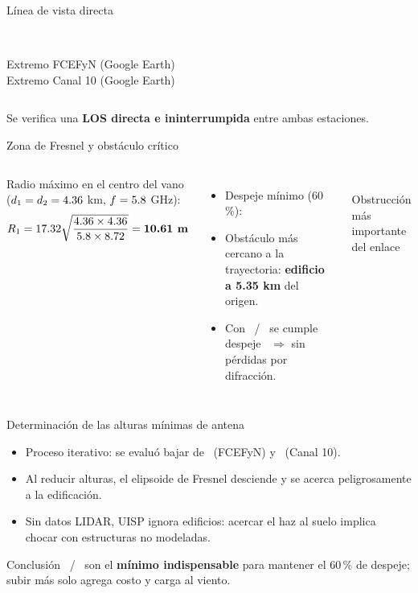 \begin{frame}{Línea de vista directa}
  \begin{columns}[c]
    \centering
    \\
    {\scriptsize Extremo FCEFyN (Google Earth)}
    \centering
    \\
    {\scriptsize Extremo Canal 10 (Google Earth)}
  \end{columns}
  \vspace{6pt}
  \centering Se verifica una \textbf{LOS directa e ininterrumpida} entre ambas estaciones.
\end{frame}

\begin{frame}{Zona de Fresnel y obstáculo crítico}
  \begin{columns}[c]
    \small
    Radio máximo en el centro del vano ($d_1=d_2=4.36$ km, $f=5.8$ GHz):
    \[
      R_1 = 17.32\sqrt{\frac{4.36\times4.36}{5.8\times 8.72}} = \textbf{10.61 m}
    \]
    \begin{itemize}
      \item Despeje mínimo (60\,\%): \textbf{\EArSesenta}
      \item Obstáculo más cercano a la trayectoria: \textbf{edificio a 5.35 km} del origen.
      \item Con \EAunoAlt\ / \EAdosAlt\ se cumple despeje \EAdespejePct\
            $\Rightarrow$ sin pérdidas por difracción.
    \end{itemize}
    \centering
    \\
    {\scriptsize Obstrucción más importante del enlace}
  \end{columns}
\end{frame}

\begin{frame}{Determinación de las alturas mínimas de antena}
  \begin{itemize}
    \item Proceso iterativo: se evaluó bajar de \EAunoAlt\ (FCEFyN) y \EAdosAlt\ (Canal 10).
    \item Al reducir alturas, el elipsoide de Fresnel desciende y se acerca peligrosamente a la
          edificación.
    \item Sin datos LIDAR, UISP ignora edificios: acercar el haz al suelo implica chocar con
          estructuras no modeladas.
  \end{itemize}
  \begin{alertblock}{Conclusión}
    \EAunoAlt\ / \EAdosAlt\ son el \textbf{mínimo indispensable} para mantener el 60\,\% de
    despeje; subir más solo agrega costo y carga al viento.
  \end{alertblock}
\end{frame}

